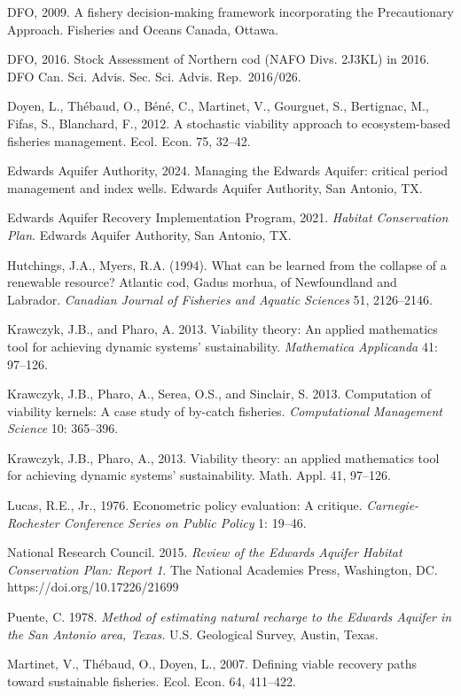 DFO, 2009. A fishery decision-making framework incorporating the
Precautionary Approach. Fisheries and Oceans Canada, Ottawa.

DFO, 2016. Stock Assessment of Northern cod (NAFO Divs. 2J3KL) in 2016.
DFO Can. Sci. Advis. Sec. Sci. Advis. Rep.~2016/026.

Doyen, L., Th\'ebaud, O., B\'en\'e, C., Martinet, V., Gourguet, S., Bertignac,
M., Fifas, S., Blanchard, F., 2012. A stochastic viability approach to
ecosystem-based fisheries management. Ecol. Econ. 75, 32--42.

Edwards Aquifer Authority, 2024. Managing the Edwards Aquifer: critical period management and
index wells. Edwards Aquifer Authority, San Antonio, TX.

Edwards Aquifer Recovery Implementation Program, 2021. \emph{Habitat Conservation Plan}. Edwards Aquifer Authority, San Antonio, TX.

Hutchings, J.A., Myers, R.A. (1994). What can be learned from the
collapse of a renewable resource? Atlantic cod, Gadus morhua, of
Newfoundland and Labrador. \emph{Canadian Journal of Fisheries and
Aquatic Sciences} 51, 2126--2146.

Krawczyk, J.B., and Pharo, A. 2013. Viability theory: An applied
mathematics tool for achieving dynamic systems' sustainability.
\emph{Mathematica Applicanda} 41: 97--126.

Krawczyk, J.B., Pharo, A., Serea, O.S., and Sinclair, S. 2013.
Computation of viability kernels: A case study of by-catch fisheries.
\emph{Computational Management Science} 10: 365--396.


Krawczyk, J.B., Pharo, A., 2013. Viability theory: an applied
mathematics tool for achieving dynamic systems' sustainability. Math.
Appl. 41, 97--126.

Lucas, R.E., Jr., 1976. Econometric policy evaluation: A critique.
\emph{Carnegie-Rochester Conference Series on Public Policy} 1: 19--46.

National Research Council. 2015. \emph{Review of the Edwards Aquifer
Habitat Conservation Plan: Report 1}. The National Academies Press,
Washington, DC. https://doi.org/10.17226/21699

Puente, C. 1978. \emph{Method of estimating natural recharge to the
Edwards Aquifer in the San Antonio area, Texas.} U.S. Geological Survey,
Austin, Texas.

Martinet, V., Th\'ebaud, O., Doyen, L., 2007. Defining viable recovery
paths toward sustainable fisheries. Ecol. Econ. 64, 411--422.

